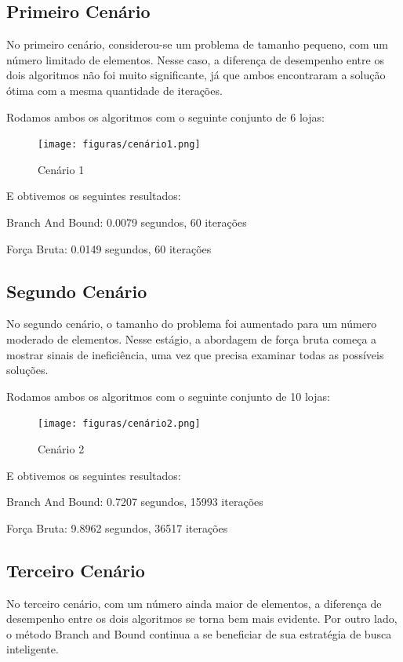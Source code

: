 \subsection{Primeiro Cenário}
No primeiro cenário, considerou-se um problema de tamanho pequeno, com um número limitado de elementos. Nesse caso, a diferença de desempenho entre os dois algoritmos não foi muito significante, já que ambos encontraram a solução ótima com a mesma quantidade de iterações. 

\newpage

Rodamos ambos os algoritmos com o seguinte conjunto de 6 lojas:
\begin{figure}[!ht]
	\centering	
	\caption[\hspace{0.1cm}Cenário 1]{Cenário 1}
	  \vspace{-0.4cm}
	\texttt{[image: figuras/cenário1.png]}
\end{figure}

E obtivemos os seguintes resultados:

Branch And Bound: 0.0079 segundos, 60 iterações

Força Bruta: 0.0149 segundos, 60 iterações

\subsection{Segundo Cenário}
No segundo cenário, o tamanho do problema foi aumentado para um número moderado de elementos. Nesse estágio, a abordagem de força bruta começa a mostrar sinais de ineficiência, uma vez que precisa examinar todas as possíveis soluções. 

Rodamos ambos os algoritmos com o seguinte conjunto de 10 lojas:
\begin{figure}[!ht]
	\centering	
	\caption[\hspace{0.1cm}Cenário 2]{Cenário 2}
	  \vspace{-0.4cm}
	\texttt{[image: figuras/cenário2.png]}
\end{figure}

E obtivemos os seguintes resultados:

Branch And Bound: 0.7207 segundos, 15993 iterações

Força Bruta: 9.8962 segundos, 36517 iterações

\subsection{Terceiro Cenário}
No terceiro cenário, com um número ainda maior de elementos, a diferença de desempenho entre os dois algoritmos se torna bem mais evidente. Por outro lado, o método Branch and Bound continua a se beneficiar de sua estratégia de busca inteligente. 


